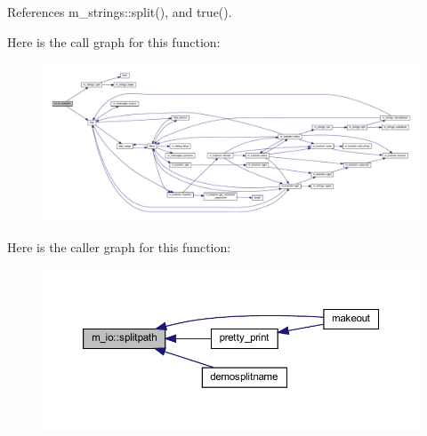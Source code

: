 References m\+\_\+strings\+::split(), and true().

Here is the call graph for this function\+:
\nopagebreak
\begin{figure}[H]
\begin{center}
\leavevmode
\includegraphics[width=350pt]{namespacem__io_a7d1857c5c839bf3e096ce68fa1447d44_cgraph}
\end{center}
\end{figure}
Here is the caller graph for this function\+:
\nopagebreak
\begin{figure}[H]
\begin{center}
\leavevmode
\includegraphics[width=350pt]{namespacem__io_a7d1857c5c839bf3e096ce68fa1447d44_icgraph}
\end{center}
\end{figure}
\mbox{\label{namespacem__io_adf7b5088ef3b4daa6c064d3e264ae821}} 
